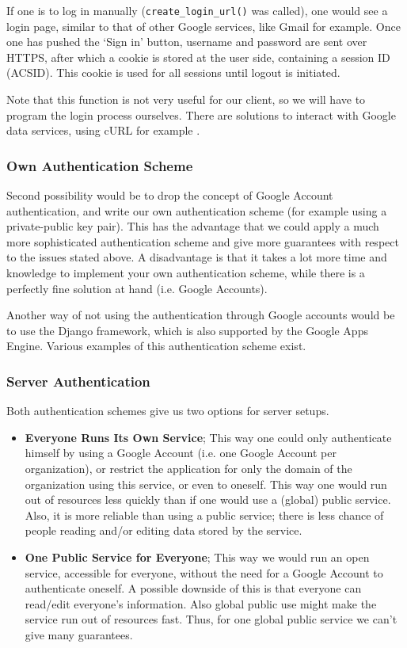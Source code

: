 If one is to log in manually (\texttt{create\_login\_url()} was called), one
would see a login page, similar to that of other Google services, like Gmail for
example. Once one has pushed the `Sign in' button, username and password are sent
over HTTPS, after which a cookie is stored at the user side, containing a session
ID (ACSID). This cookie is used for all sessions until logout is initiated.
 
Note that this function is not very useful for our client, so we will have to
program the login process ourselves. There are solutions to interact with Google
data services, using cURL  for example .

\subsubsection{Own Authentication Scheme}
Second possibility would be to drop the concept of Google Account authentication,
and write our own authentication scheme (for example using a private-public key
pair). This has the advantage that we could apply a much more sophisticated
authentication scheme and give more guarantees with respect to the issues stated
above. A disadvantage is that it takes a lot more time and knowledge to implement
your own authentication scheme, while there is a perfectly fine solution at hand
(i.e. Google Accounts).

Another way of not using the authentication through Google accounts would be to
use the Django  framework, which is also supported by the Google Apps Engine.
Various examples of this authentication scheme exist.

\subsubsection{Server Authentication}
Both authentication schemes give us two options for server setups.

\begin{itemize}
  \item \textbf{Everyone Runs Its Own Service}; This way one could only
  authenticate himself by using a Google Account (i.e. one Google Account per
  organization), or restrict the application for only the domain of the
  organization using this service, or even to oneself. This way one would run out
  of resources less quickly than if one would use a (global) public service.
  Also, it is more reliable than using a public service; there is less chance of
  people reading and/or editing data stored by the service.
  \item \textbf{One Public Service for Everyone}; This way we would run an open
  service, accessible for everyone, without the need for a Google Account to
  authenticate oneself. A possible downside of this is that everyone can
  read/edit everyone's information. Also global public use might make the service
  run out of resources fast. Thus, for one global public service we can't give
  many guarantees.
\end{itemize}

